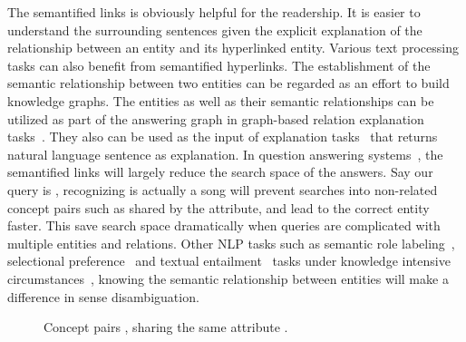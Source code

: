 The semantified links is obviously helpful for the readership.
It is easier to understand the surrounding sentences given the explicit explanation of the relationship between an entity and its hyperlinked entity.
Various text processing tasks can also benefit from semantified hyperlinks.
The establishment of the semantic relationship between two entities can be regarded as an effort to build knowledge graphs.
The entities as well as their semantic relationships can be utilized as part of the answering graph in graph-based relation explanation tasks~\cite{fang2011rex}.
They also can be used as the input of explanation tasks~\cite{voskarideslearning} that returns natural language sentence as explanation.
In question answering systems~\cite{yang2014slq}, the semantified links will largely reduce the search space of the answers.
Say our query is , recognizing  is actually a song will prevent searches into non-related concept pairs such as  shared by the attribute, and lead to the correct entity  faster.
This save search space dramatically when queries are complicated with multiple entities and relations.
Other NLP tasks such as semantic role labeling~\cite{palmer2010semantic}, selectional preference~\cite{pantel2007isp} and textual entailment~\cite{androutsopoulos2010survey} tasks under knowledge intensive circumstances~\cite{yao2012unsupervised,exner2011using}, knowing the semantic relationship between entities will make a difference in sense disambiguation.

\begin{figure}[!htb]
\centering
{}
\caption{\scriptsize Concept pairs ,  sharing the same attribute .}
\label{fig:writer}
\end{figure}


